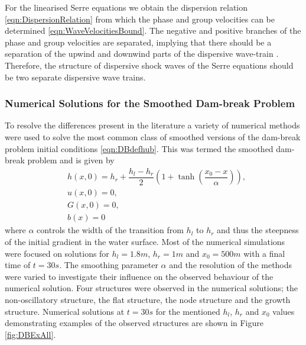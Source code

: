 For the linearised Serre equations we obtain the dispersion relation \eqref{eqn:DispersionRelation} from which the phase and group velocities can be determined \eqref{eqn:WaveVelocitiesBound}. The negative and positive branches of the phase and group velocities are separated, implying that there should be a separation of the upwind and downwind parts of the dispersive wave-train \cite{Dougalis-etal-2007}. Therefore, the structure of dispersive shock waves of the Serre equations should be two separate dispersive wave trains.


\subsubsection{Numerical Solutions for the Smoothed Dam-break Problem}
To resolve the differences present in the literature a variety of numerical methods were used to solve the most common class of smoothed versions of the dam-break problem initial conditions \eqref{eqn:DBdefhub}. This was termed the smoothed dam-break problem and is given by
\begin{subequations}
	\begin{align}
	&h(x,0) = h_r + \dfrac{h_l - h_r}{2} \left(1 +  \tanh\left(\dfrac{x_0 - x}{\alpha}\right) \right), \\
	&u(x,0) = 0 , \\
	&G(x,0) = 0 , \\
	&b(x) = 0
	\end{align}
	\label{eqn:SmoothDB}
\end{subequations}
where $\alpha$ controls the width of the transition from $h_l$ to $h_r$ and thus the steepness of the initial gradient in the water surface. Most of the numerical simulations were focused on solutions for $h_l = 1.8m$, $h_r = 1m$ and $x_0 = 500m$ with a final time of $t=30s$. The smoothing parameter $\alpha$ and the resolution of the methods were varied to investigate their influence on the observed behaviour of the numerical solution. Four structures were observed in the numerical solutions; the non-oscillatory structure, the flat structure, the node structure and the growth structure. Numerical solutions at $t=30s$ for the mentioned $h_l$, $h_r$ and $x_0$ values demonstrating examples of the observed structures are shown in Figure \ref{fig:DBExAll}. 
